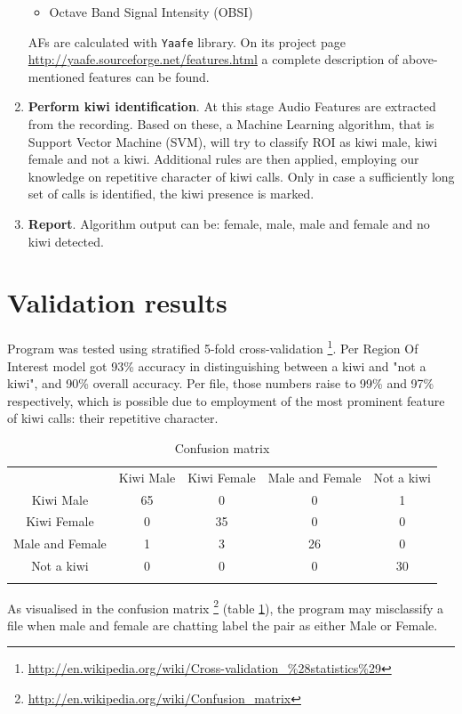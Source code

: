 \documentclass[paper=a4, fontsize=11pt]{scrartcl}	%
\numberwithin{equation}{section}		%
\numberwithin{figure}{section}			%
\numberwithin{table}{section}				%
\begin{document}
\begin{enumerate}
\begin{itemize}
		\item Octave Band Signal Intensity (OBSI)
	\end{itemize}
	AFs are calculated with \texttt{Yaafe} library. On its project page \url{http://yaafe.sourceforge.net/features.html} a complete description of above-mentioned features can be found.
	\item \textbf{Perform kiwi identification}. At this stage Audio Features are extracted from the recording. Based on these, a Machine Learning algorithm, that is Support Vector Machine (SVM), will try to classify ROI as kiwi male, kiwi female and not a kiwi. Additional rules are then applied, employing our knowledge on repetitive character of kiwi calls. Only in case a sufficiently long set of calls is identified, the kiwi presence is marked. 
	\item \textbf{Report}. Algorithm output can be: female, male, male and female and no kiwi detected.
\end{enumerate}

\section{Validation results}
Program was tested using stratified 5-fold cross-validation \footnote{\url{http://en.wikipedia.org/wiki/Cross-validation_\%28statistics\%29}}. Per Region Of Interest model got 93\% accuracy in distinguishing between a kiwi and "not a kiwi", and 90\% overall accuracy. Per file, those numbers raise to 99\% and 97\% respectively, which is possible due to employment of the most prominent feature of kiwi calls: their repetitive character. 

\begin{table}[hp]
\label{tab:confusion}
\caption{Confusion matrix}
\begin{tabularx}{.7\textwidth}{c|c c c c |}
 & Kiwi Male & Kiwi Female & Male and Female & \multicolumn{1}{c}{Not a kiwi} \\
\hhline{-----}
Kiwi Male & 65 \cellcolor[gray]{.8}& 0 & 0 & 1 \\
Kiwi Female & 0 & 35 \cellcolor[gray]{.8}& 0 & 0 \\
Male and Female & 1 & 3 & 26 \cellcolor[gray]{.8} & 0 \\
Not a kiwi & 0 & 0 & 0 & 30 \cellcolor[gray]{.8} \\
\hhline{~----}
\end{tabularx}
\end{table}

As visualised in the confusion matrix \footnote{\url{http://en.wikipedia.org/wiki/Confusion_matrix}} (table \ref{tab:confusion}), the program may misclassify a file when male and female are chatting label the pair as either Male or Female.
\end{document}
